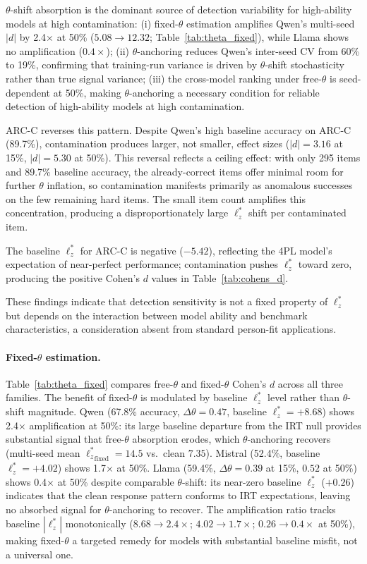 $\theta$-shift absorption is the dominant source of detection variability for high-ability models at high contamination:
(i) fixed-$\theta$ estimation amplifies Qwen's multi-seed $|d|$ by 2.4$\times$ at 50\% ($5.08 \to 12.32$; Table~\ref{tab:theta_fixed}), while Llama shows no amplification ($0.4\times$);
(ii) $\theta$-anchoring reduces Qwen's inter-seed CV from 60\% to 19\%, confirming that training-run variance is driven by $\theta$-shift stochasticity rather than true signal variance;
(iii) the cross-model ranking under free-$\theta$ is seed-dependent at 50\%, making $\theta$-anchoring a necessary condition for reliable detection of high-ability models at high contamination.

ARC-C reverses this pattern.
Despite Qwen's high baseline accuracy on ARC-C (89.7\%), contamination produces larger, not smaller, effect sizes ($|d|{=}3.16$ at 15\%, $|d|{=}5.30$ at 50\%).
This reversal reflects a ceiling effect: with only 295 items and 89.7\% baseline accuracy, the already-correct items offer minimal room for further $\theta$ inflation, so contamination manifests primarily as anomalous successes on the few remaining hard items.
The small item count amplifies this concentration, producing a disproportionately large $\ell_z^*$ shift per contaminated item.

The baseline $\ell_z^*$ for ARC-C is negative ($-5.42$), reflecting the 4PL model's expectation of near-perfect performance; contamination pushes $\ell_z^*$ toward zero, producing the positive Cohen's $d$ values in Table~\ref{tab:cohens_d}.

These findings indicate that detection sensitivity is not a fixed property of $\ell_z^*$ but depends on the interaction between model ability and benchmark characteristics, a consideration absent from standard person-fit applications.

\paragraph{Fixed-$\theta$ estimation.}
Table~\ref{tab:theta_fixed} compares free-$\theta$ and fixed-$\theta$ Cohen's $d$ across all three families.
The benefit of fixed-$\theta$ is modulated by baseline $\ell_z^*$ level rather than $\theta$-shift magnitude.
Qwen (67.8\% accuracy, $\Delta\theta{=}0.47$, baseline $\ell_z^*{=}{+}8.68$) shows 2.4$\times$ amplification at 50\%: its large baseline departure from the IRT null provides substantial signal that free-$\theta$ absorption erodes, which $\theta$-anchoring recovers (multi-seed mean ${\ell_z^*}_{\text{fixed}} {=} 14.5$ vs.\ clean $7.35$).
Mistral (52.4\%, baseline $\ell_z^*{=}{+}4.02$) shows 1.7$\times$ at 50\%.
Llama (59.4\%, $\Delta\theta{=}0.39$ at 15\%, $0.52$ at 50\%) shows 0.4$\times$ at 50\% despite comparable $\theta$-shift: its near-zero baseline $\ell_z^*$ ($+0.26$) indicates that the clean response pattern conforms to IRT expectations, leaving no absorbed signal for $\theta$-anchoring to recover.
The amplification ratio tracks baseline $|\ell_z^*|$ monotonically ($8.68 {\to} 2.4{\times}$; $4.02 {\to} 1.7{\times}$; $0.26 {\to} 0.4{\times}$ at 50\%), making fixed-$\theta$ a targeted remedy for models with substantial baseline misfit, not a universal one.

